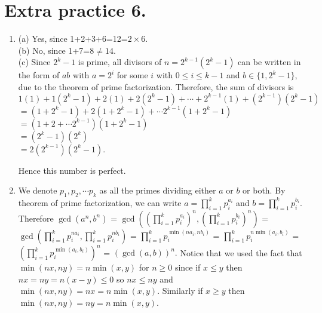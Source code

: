 \documentclass[11pt]{article}
\begin{document}
\section {Extra practice 6.}
\begin{enumerate}
\item (a) Yes, since 1+2+3+6=12=$2\times 6$.\\
(b) No, since 1+7=8$\neq 14$.\\
(c) Since $2^k-1$ is prime, all divisors of $n=2^{k-1}(2^k-1)$ can be written in the form of $ab$ with $a=2^i$ for some $i$ with $0\le i\le k-1$ and $b\in\{1, 2^k-1\}$, due to the theorem of prime factorization. Therefore, the sum of divisors is\\ $1(1)+1(2^k-1)+2(1)+2(2^k-1)+\cdots + 2^{k-1}(1)+(2^{k-1})(2^k-1)$\\
$=(1+2^k-1)+2(1+2^k-1)+\cdots 2^{k-1}(1+2^k-1)$\\
$=(1+2+\cdots 2^{k-1})(1+2^k-1)$\\
$=(2^k-1)(2^k)$\\
$=2(2^{k-1})(2^k-1)$.

Hence this number is perfect.

\item We denote $p_1, p_2,\cdots p_k$ as all the primes dividing either $a$ or $b$ or both. By theorem of prime factorization, we can write $a=\displaystyle\prod_{i=1}^{k} p_i^{a_i}$ and $b=\displaystyle\prod_{i=1}^{k} p_i^{b_i}$. Therefore $\gcd (a^n, b^n)$ 
= $\gcd \left(\left(\displaystyle\prod_{i=1}^{k} p_i^{a_i}\right)^n, \left(\displaystyle\prod_{i=1}^{k} p_i^{b_i}\right)^n\right)$
= $\gcd \left(\displaystyle\prod_{i=1}^{k} p_i^{na_i}, \displaystyle\prod_{i=1}^{k} p_i^{nb_i}\right)$
= $\displaystyle\prod_{i=1}^{k} p_i^{\min (na_i, nb_i)}$
= $\displaystyle\prod_{i=1}^{k} p_i^{n\min (a_i, b_i)}$
= $\left(\displaystyle\prod_{i=1}^{k} p_i^{\min (a_i, b_i)}\right)^n$
= $(\gcd (a,b))^n.$ Notice that we used the fact that $\min (nx, ny)=n\min (x,y)$ for $n\ge 0$ since if $x\le y$ then $nx=ny=n(x-y)\le 0$ so $nx\le ny$ and $\min (nx, ny)=nx=n\min (x,y)$. Similarly if $x\ge y$ then $\min (nx, ny)=ny=n\min (x,y)$.
\end{enumerate}
\end{document}
